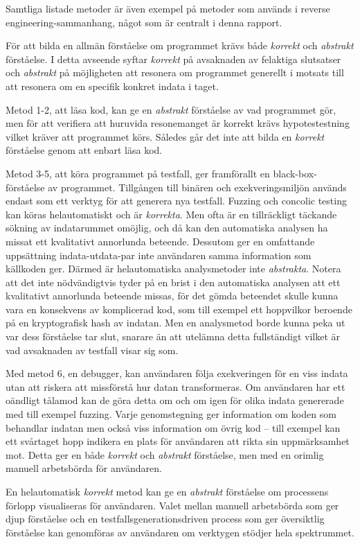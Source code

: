 Samtliga listade metoder är även exempel på metoder som används i reverse
engineering-sammanhang, något som är centralt i denna rapport.

För att bilda en allmän förståelse om programmet krävs både \textit{korrekt} och
\textit{abstrakt} förståelse. I detta avseende syftar \textit{korrekt} på
avsaknaden av felaktiga slutsatser och \textit{abstrakt} på möjligheten att
resonera om programmet generellt i motsats till att resonera om en specifik
konkret indata i taget.

Metod 1-2, att läsa kod, kan ge en \textit{abstrakt} förståelse av vad
programmet gör, men för att verifiera att huruvida resonemanget är korrekt krävs
hypotestestning vilket kräver att programmet körs. Således går det inte att
bilda en \textit{korrekt} förståelse genom att enbart läsa kod.

Metod 3-5, att köra programmet på testfall, ger framförallt en
black-box-förståelse av programmet. Tillgången till binären och
exekveringsmiljön används endast som ett verktyg för att generera nya testfall.
Fuzzing och concolic testing kan köras helautomatiskt och är \textit{korrekta}.
Men ofta är en tillräckligt täckande sökning av indatarummet omöjlig, och då kan
den automatiska analysen ha missat ett kvalitativt annorlunda beteende. Dessutom
ger en omfattande uppsättning indata-utdata-par inte användaren samma
information som källkoden ger. Därmed är helautomatiska analysmetoder inte
\textit{abstrakta}. Notera att det inte nödvändigtvis tyder på en brist i den
automatiska analysen att ett kvalitativt annorlunda beteende missas, för det
gömda beteendet skulle kunna vara en konsekvens av komplicerad kod, som till
exempel ett hoppvilkor beroende på en kryptografisk hash av indatan. Men en
analysmetod borde kunna peka ut var dess förståelse tar slut, snarare än att
utelämna detta fullständigt vilket är vad avsaknaden av testfall visar sig som.

Med metod 6, en debugger, kan användaren följa exekveringen för en viss indata
utan att riskera att missförstå hur datan transformeras. Om användaren har ett
oändligt tålamod kan de göra detta om och om igen för olika indata genererade
med till exempel fuzzing. Varje genomstegning ger information om koden som
behandlar indatan men också viss information om övrig kod -- till exempel kan
ett svårtaget hopp indikera en plats för användaren att rikta sin uppmärksamhet
mot. Detta ger en både \textit{korrekt} och \textit{abstrakt} förståelse, men
med en orimlig manuell arbetsbörda för användaren.

En helautomatisk \textit{korrekt} metod kan ge en \textit{abstrakt} förståelse
om processens förlopp visualiseras för användaren. Valet mellan manuell
arbetsbörda som ger djup förståelse och en testfallsgenerationsdriven process
som ger översiktlig förståelse kan genomföras av användaren om verktygen stödjer
hela spektrummet.
